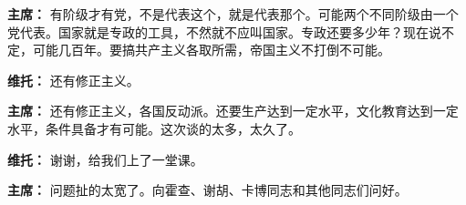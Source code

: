 \begin{list}{}
\item[\textbf{主席：}] 有阶级才有党，不是代表这个，就是代表那个。可能两个不同阶级由一个党代表。国家就是专政的工具，不然就不应叫国家。专政还要多少年？现在说不定，可能几百年。要搞共产主义各取所需，帝国主义不打倒不可能。
\item[\textbf{维托：}] 还有修正主义。
\item[\textbf{主席：}] 还有修正主义，各国反动派。还要生产达到一定水平，文化教育达到一定水平，条件具备才有可能。这次谈的太多，太久了。
\item[\textbf{维托：}] 谢谢，给我们上了一堂课。
\item[\textbf{主席：}] 问题扯的太宽了。向霍查、谢胡、卡博同志和其他同志们问好。
\end{list}

